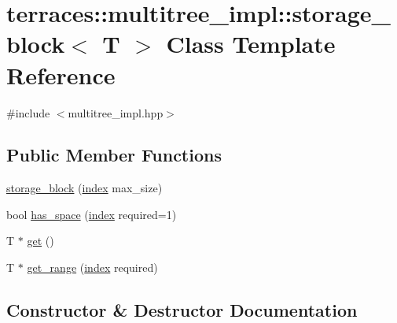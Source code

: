 \hypertarget{classterraces_1_1multitree__impl_1_1storage__block}{}\section{terraces\+:\+:multitree\+\_\+impl\+:\+:storage\+\_\+block$<$ T $>$ Class Template Reference}
\label{classterraces_1_1multitree__impl_1_1storage__block}


{\ttfamily \#include $<$multitree\+\_\+impl.\+hpp$>$}

\subsection*{Public Member Functions}
\begin{DoxyCompactItemize}
\item 
\hyperlink{classterraces_1_1multitree__impl_1_1storage__block_a7acd5712c129b6b696d765110dbf4ae3}{storage\+\_\+block} (\hyperlink{namespaceterraces_adbc33ccb543d1634e96d0eb02e472c77}{index} max\+\_\+size)
\item 
bool \hyperlink{classterraces_1_1multitree__impl_1_1storage__block_ad96d4d6043d66550c587ba7e2d6101c1}{has\+\_\+space} (\hyperlink{namespaceterraces_adbc33ccb543d1634e96d0eb02e472c77}{index} required=1)
\item 
T $\ast$ \hyperlink{classterraces_1_1multitree__impl_1_1storage__block_aba7c0316e7d2f65bf2139666512c7abb}{get} ()
\item 
T $\ast$ \hyperlink{classterraces_1_1multitree__impl_1_1storage__block_af7571da3ca9cb0eb53bdb0a04b42585f}{get\+\_\+range} (\hyperlink{namespaceterraces_adbc33ccb543d1634e96d0eb02e472c77}{index} required)
\end{DoxyCompactItemize}


\subsection{Constructor \& Destructor Documentation}
\mbox{\label{classterraces_1_1multitree__impl_1_1storage__block_a7acd5712c129b6b696d765110dbf4ae3}} 
